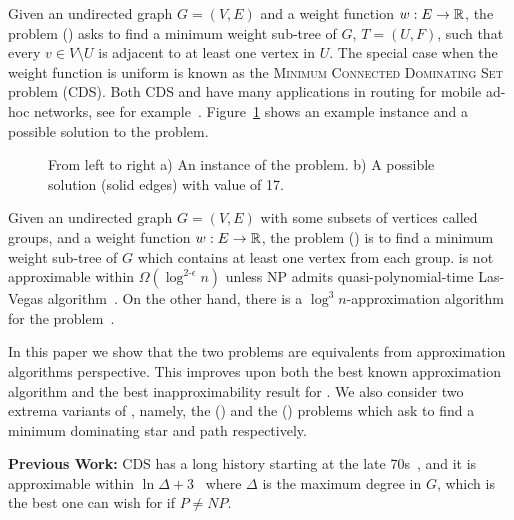 Given an undirected graph $G = (V, E)$ and a weight function $w:E \to \mathbb{R}$, 
the \Problem{} problem (\Prob{}) asks to find a minimum weight sub-tree of $G$, 
$T = (U, F)$, such that every $v \in V \setminus U$ is adjacent to at least one 
vertex in $U$.
The special case when the weight function is uniform is known as the 
\textsc{Minimum Connected Dominating Set} problem (CDS). 
Both CDS and \Prob{} have many applications in routing
for mobile ad-hoc networks, see for 
example~\cite{shin2010approximation,cheng2003polynomial,das1997routing,adasme2016models,adasme2017minimum}.
Figure~\ref{fig:problem} shows an example instance and a possible solution to the problem. 

\begin{figure}
\begin{center}

\end{center}
\caption{\label{fig:problem}
From left to right
a) An instance of the \Problem{} problem.
b) A possible solution (solid edges) with value of 17.
}
\end{figure}

Given an undirected graph $G = (V, E)$ with some subsets of vertices called groups,
and a weight function $w:E \to \mathbb{R}$,
the \ProblemGroup{} problem (\ProbGroup{}) is to find a minimum weight sub-tree
of $G$ which contains at least one vertex from each group.
\ProbGroup{} is not approximable within $ \Omega(\log^{2\textbf{-}\epsilon}n)$
unless NP admits quasi-polynomial-time Las-Vegas
algorithm~\cite{halperin2003polylogarithmic}.
On the other hand, there is a $\log^3 n$-approximation algorithm for the 
problem~\cite{garg2000polylogarithmic}.

In this paper we show that the two problems are equivalents 
from approximation algorithms perspective.
This improves upon both the best known approximation algorithm and the best 
inapproximability result for \Prob{}.
We also consider two extrema variants of \Prob{}, namely,
the \ProblemStar{} (\ProbStar{}) and the \ProblemPath{} (\ProbPath{}) 
problems which ask to find a minimum dominating star and path respectively.  

\textbf{Previous Work:}
CDS has a long history starting at the late 70s~\cite{sampathkumar1979connected},
and it is approximable within $\ln\Delta + 3$~\cite{guha1998approximation} 
where $\Delta$ is the maximum degree in $G$,
which is the best one can wish for if $P \neq NP$. 

